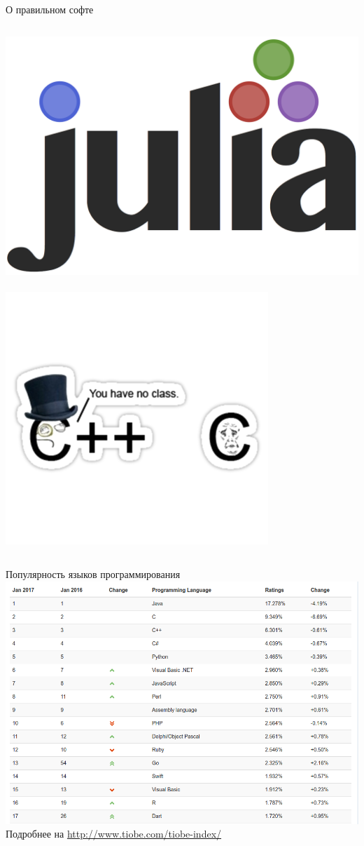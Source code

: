 \documentclass[aspectratio=169,newPxFont]{beamer}
\begin{document}
\begin{frame}{О правильном софте}
\begin{columns}
\begin{column}{.48\linewidth}
\centering
\includegraphics[width=0.5\linewidth]{julia-logo.png}
\mbox{ } \\
\includegraphics[width=0.7\linewidth]{c-vs-cpp.png}
\end{column}
\end{columns}
\end{frame}


\begin{frame}{Популярность языков программирования}
\centering \includegraphics[width=0.6\linewidth]{lang.png}\\
\vspace{0.2cm}
Подробнее на {\url{http://www.tiobe.com/tiobe-index/}}
\end{frame}
\end{document}
